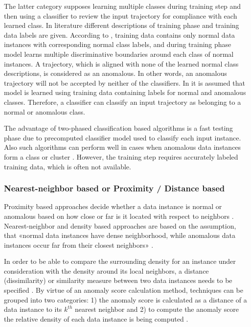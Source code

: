 The latter category supposes learning multiple classes during training step and then using a classifier to review the input trajectory for compliance with each learned class. In literature different descriptions of training phase and training data labels are given. According to \cite{article:15_survey_ad}, training data contains only normal data instances with corresponding normal class labels, and during training phase model learns multiple discriminative boundaries around each class of normal instances. A trajectory, which is aligned with none of the learned normal class descriptions, is considered as an anomalous. In other words, an anomalous trajectory will not be accepted by neither of the classifiers. In \cite{article:6_survey_anom_det_rtuvs} it is assumed that model is learned using training data containing labels for normal and anomalous classes. Therefore, a classifier can classify an input trajectory as belonging to a normal or anomalous class.

The advantage of two-phased classification based algorithms is a fast testing phase due to precomputed classifier model used to classify each input instance. Also such algorithms can perform well in cases when anomalous data instances form a class or cluster \cite{inproceedings:18_ardod_lstd}. However, the training step requires accurately labeled training data, which is often not available. 

\subsubsection{Nearest-neighbor based \cite{article:15_survey_ad} or Proximity / Distance based \cite{article:6_survey_anom_det_rtuvs}\cite{inproceedings:18_ardod_lstd}}

Proximity based approaches decide whether a data instance is normal or anomalous based on how close or far is it located with respect to neighbors \cite{article:6_survey_anom_det_rtuvs}. Nearest-neighbor and density based approaches are based on the assumption, that «normal data instances have dense neighborhood, while anomalous data instances occur far from their closest neighbors» \cite{article:15_survey_ad}.

In order to be able to compare the surrounding density for an instance under consideration with the density around its local neighbors, a distance (dissimilarity) or similarity measure between two data instances needs to be specified \cite{inproceedings:18_ardod_lstd}. By virtue of an anomaly score calculation method, techniques can be grouped into two categories: 1) the anomaly score is calculated as a distance of a data instance to its $k^{th}$ nearest neighbor and 2) to compute the anomaly score the relative density of each data instance is being computed \cite{article:15_survey_ad}.

